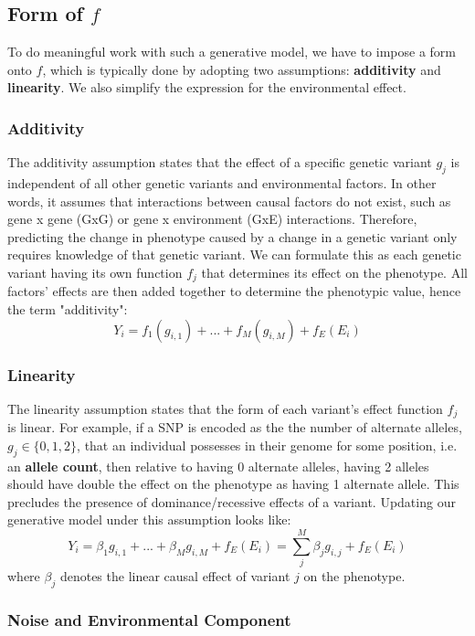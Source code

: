 \documentclass[12pt]{article}
\begin{document}
\subsection{\texorpdfstring{Form of $f$}{Form of f}}

To do meaningful work with such a generative model, we have to impose a form onto $f$, which is typically done by adopting two assumptions: \textbf{additivity} and \textbf{linearity}.
We also simplify the expression for the environmental effect.

\subsubsection{Additivity}
The additivity assumption states that the effect of a specific genetic variant $g_j$ is independent of all other genetic variants and environmental factors.
In other words, it assumes that interactions between causal factors do not exist, such as gene x gene (GxG) or gene x environment (GxE) interactions.
Therefore, predicting the change in phenotype caused by a change in a genetic variant only requires knowledge of that genetic variant.
We can formulate this as each genetic variant having its own function $f_j$ that determines its effect on the phenotype.
All factors' effects are then added together to determine the phenotypic value, hence the term "additivity":
$$ Y_i = f_1(g_{i,1}) + ... + f_M(g_{i,M}) + f_E(E_{i}) $$

\subsubsection{Linearity}
The linearity assumption states that the form of each variant's effect function $f_j$ is linear.
For example, if a SNP is encoded as the the number of alternate alleles, $g_j \in \{0, 1, 2\}$, that an individual possesses in their genome for some position, i.e. an \textbf{allele count}, then relative to having 0 alternate alleles, having 2 alleles should have double the effect on the phenotype as having 1 alternate allele.
This precludes the presence of dominance/recessive effects of a variant.
Updating our generative model under this assumption looks like:
$$ Y_i = \beta_1 g_{i,1} + ... + \beta_M g_{i,M} + f_E(E_i) = 
\sum_j^M \beta_j g_{i,j} + f_E(E_i)
$$
where $\beta_j$ denotes the linear causal effect of variant $j$ on the phenotype.

\subsubsection{Noise and Environmental Component}
\end{document}
